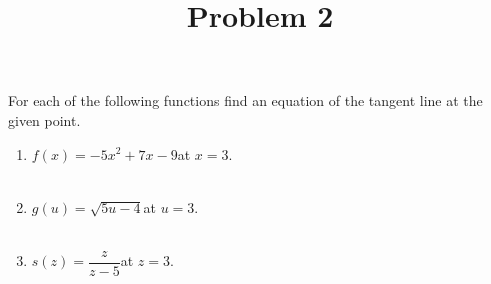 \documentclass{ximera}
\title[Problem 2]{Problem 2}
\begin{document}
\begin{abstract} \end{abstract}
\maketitle

\begin{problem}
 For each of the following functions find an equation of the tangent line at the given point.
  \begin{enumerate}
    \item $f(x) = -5x^2 + 7x - 9$\quad at $x = 3$. \\ \\
    \item $g(u) = \sqrt{5u-4}$\quad at $u = 3$. \\ \\
    \item $\displaystyle s(z) = \dfrac{z}{z-5}$\quad at $z = 3$.
  \end{enumerate}
\end{problem}
\end{document}
